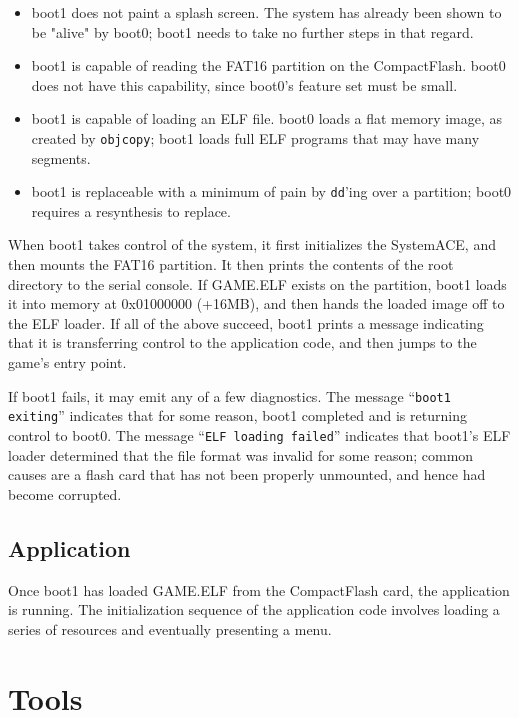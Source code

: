 \documentclass[10pt]{article}
\begin{document}
\begin{itemize}
\item{boot1 does not paint a splash screen. The system has already been
shown to be "alive" by boot0; boot1 needs to take no further steps in that
regard.}
\item{boot1 is capable of reading the FAT16 partition on the CompactFlash.
boot0 does not have this capability, since boot0's feature set must be
small.}
\item{boot1 is capable of loading an ELF file. boot0 loads a flat memory
image, as created by \texttt{objcopy}; boot1 loads full ELF programs that
may have many segments.}
\item{boot1 is replaceable with a minimum of pain by \texttt{dd}'ing over a
partition; boot0 requires a resynthesis to replace.}
\end{itemize}

When boot1 takes control of the system, it first initializes the SystemACE,
and then mounts the FAT16 partition. It then prints the contents of the root
directory to the serial console. If GAME.ELF exists on the partition, boot1
loads it into memory at 0x01000000 (+16MB), and then hands the loaded image
off to the ELF loader. If all of the above succeed, boot1 prints a message
indicating that it is transferring control to the application code, and then
jumps to the game's entry point.

If boot1 fails, it may emit any of a few diagnostics. The message
``\texttt{boot1 exiting}'' indicates that for some reason, boot1 completed
and is returning control to boot0.  The message ``\texttt{ELF loading
failed}'' indicates that boot1's ELF loader determined that the file format
was invalid for some reason; common causes are a flash card that has not
been properly unmounted, and hence had become corrupted.

\subsection{Application}

Once boot1 has loaded GAME.ELF from the CompactFlash card, the application
is running. The initialization sequence of the application code involves
loading a series of resources and eventually presenting a menu.

\section{Tools}
\end{document}
